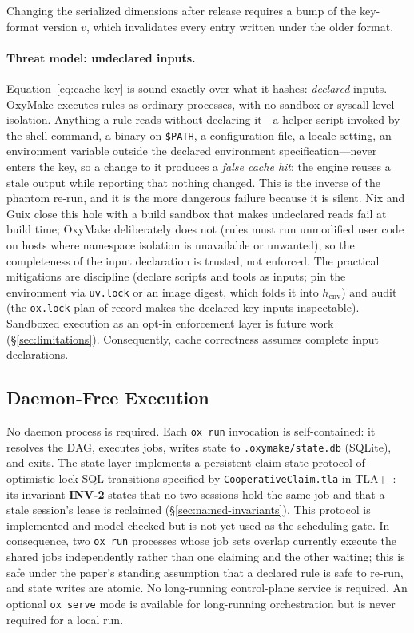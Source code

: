 \documentclass[12pt,a4paper]{article}
\newcommand{\code}[1]{{\texttt{\small\color{inlinecode}#1}}}
\begin{document}
Changing the serialized dimensions after release requires a bump of the
key-format version $v$, which invalidates every entry written under the
older format.

\paragraph{Threat model: undeclared inputs.}
\label{sec:undeclared-inputs}
Equation~\ref{eq:cache-key} is sound exactly over what it hashes:
\emph{declared} inputs. OxyMake executes rules as ordinary processes,
with no sandbox or syscall-level isolation. Anything a rule reads
without declaring it---a helper script invoked by the shell command, a
binary on \code{\$PATH}, a configuration file, a locale setting, an
environment variable outside the declared environment
specification---never enters the key, so a change to it produces a
\emph{false cache hit}: the engine reuses a stale output while
reporting that nothing changed. This is
the inverse of the phantom re-run, and it is the more dangerous
failure because it is silent. Nix and Guix close this hole with a
build sandbox that makes undeclared reads fail at build time; OxyMake
deliberately does not (rules must run unmodified user code on hosts
where namespace isolation is unavailable or unwanted), so the
completeness of the input declaration is trusted, not enforced. The
practical mitigations are discipline (declare scripts and tools as
inputs; pin the environment via \code{uv.lock} or an image digest,
which folds it into $h_{\text{env}}$) and audit (the \code{ox.lock}
plan of record makes the declared key inputs inspectable). Sandboxed
execution as an opt-in enforcement layer is future work
(\S\ref{sec:limitations}). Consequently, cache correctness assumes
complete input declarations.

\subsection{Daemon-Free Execution}
\label{sec:daemon-free}

No daemon process is required. Each \code{ox run} invocation is
self-contained: it resolves the DAG, executes jobs, writes state to
\code{.oxymake/state.db} (SQLite), and exits. The state layer
implements a persistent claim-state protocol of optimistic-lock SQL
transitions specified by \code{Cooperative\allowbreak Claim.tla}
in TLA+~\cite{lamportSpecifyingSystems2002}: its invariant
\textbf{INV-2} states that no two sessions hold the same job and that a
stale session's lease is reclaimed (\S\ref{sec:named-invariants}). This
protocol is implemented and model-checked but is not yet used as the
scheduling gate. In consequence, two \code{ox run} processes whose job
sets overlap currently execute the shared jobs independently rather than
one claiming and the other waiting; this is safe under the paper's
standing assumption that a declared rule is safe to re-run, and state
writes are atomic. No long-running control-plane service is required. An
optional \code{ox serve} mode is available for long-running
orchestration but is never required for a local run.
\end{document}
